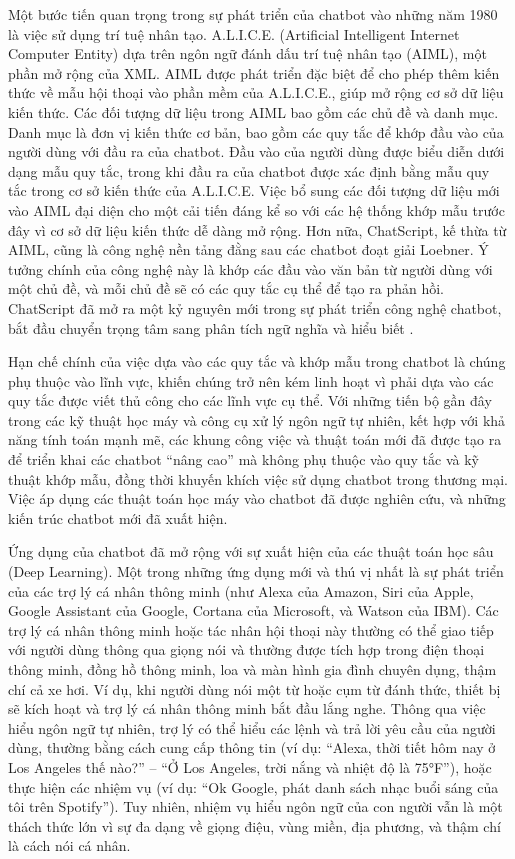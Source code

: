 Một bước tiến quan trọng trong sự phát triển của chatbot vào những năm 1980 là việc sử dụng trí tuệ nhân tạo. A.L.I.C.E. (Artificial Intelligent Internet Computer Entity) dựa trên ngôn ngữ đánh dấu trí tuệ nhân tạo (AIML), một phần mở rộng của XML. AIML được phát triển đặc biệt để cho phép thêm kiến thức về mẫu hội thoại vào phần mềm của A.L.I.C.E., giúp mở rộng cơ sở dữ liệu kiến thức. Các đối tượng dữ liệu trong AIML bao gồm các chủ đề  và danh mục. Danh mục là đơn vị kiến thức cơ bản, bao gồm các quy tắc để khớp đầu vào của người dùng với đầu ra của chatbot. Đầu vào của người dùng được biểu diễn dưới dạng mẫu quy tắc, trong khi đầu ra của chatbot được xác định bằng mẫu quy tắc trong cơ sở kiến thức của A.L.I.C.E. Việc bổ sung các đối tượng dữ liệu mới vào AIML đại diện cho một cải tiến đáng kể so với các hệ thống khớp mẫu trước đây vì cơ sở dữ liệu kiến thức dễ dàng mở rộng. Hơn nữa, ChatScript, kế thừa từ AIML, cũng là công nghệ nền tảng đằng sau các chatbot đoạt giải Loebner. Ý tưởng chính của công nghệ này là khớp các đầu vào văn bản từ người dùng với một chủ đề, và mỗi chủ đề sẽ có các quy tắc cụ thể để tạo ra phản hồi. ChatScript đã mở ra một kỷ nguyên mới trong sự phát triển công nghệ chatbot, bắt đầu chuyển trọng tâm sang phân tích ngữ nghĩa và hiểu biết \cite{cahn2017chatbot,bradesko2012survey, wilcox2014winning, abushawar2015alice, shum2018elizaxiaoicechallengesopportunities,zemcik2019chatbots}.


Hạn chế chính của việc dựa vào các quy tắc và khớp mẫu trong chatbot là chúng phụ thuộc vào lĩnh vực, khiến chúng trở nên kém linh hoạt vì phải dựa vào các quy tắc được viết thủ công cho các lĩnh vực cụ thể. Với những tiến bộ gần đây trong các kỹ thuật học máy và công cụ xử lý ngôn ngữ tự nhiên, kết hợp với khả năng tính toán mạnh mẽ, các khung công việc và thuật toán mới đã được tạo ra để triển khai các chatbot “nâng cao” mà không phụ thuộc vào quy tắc và kỹ thuật khớp mẫu, đồng thời khuyến khích việc sử dụng chatbot trong thương mại. Việc áp dụng các thuật toán học máy vào chatbot đã được nghiên cứu, và những kiến trúc chatbot mới đã xuất hiện.


Ứng dụng của chatbot đã mở rộng với sự xuất hiện của các thuật toán học sâu (Deep Learning). Một trong những ứng dụng mới và thú vị nhất là sự phát triển của các trợ lý cá nhân thông minh (như Alexa của Amazon, Siri của Apple, Google Assistant của Google, Cortana của Microsoft, và Watson của IBM). Các trợ lý cá nhân thông minh hoặc tác nhân hội thoại này thường có thể giao tiếp với người dùng thông qua giọng nói và thường được tích hợp trong điện thoại thông minh, đồng hồ thông minh, loa và màn hình gia đình chuyên dụng, thậm chí cả xe hơi. Ví dụ, khi người dùng nói một từ hoặc cụm từ đánh thức, thiết bị sẽ kích hoạt và trợ lý cá nhân thông minh bắt đầu lắng nghe. Thông qua việc hiểu ngôn ngữ tự nhiên, trợ lý có thể hiểu các lệnh và trả lời yêu cầu của người dùng, thường bằng cách cung cấp thông tin (ví dụ: “Alexa, thời tiết hôm nay ở Los Angeles thế nào?” – “Ở Los Angeles, trời nắng và nhiệt độ là 75°F”), hoặc thực hiện các nhiệm vụ (ví dụ: “Ok Google, phát danh sách nhạc buổi sáng của tôi trên Spotify”). Tuy nhiên, nhiệm vụ hiểu ngôn ngữ của con người vẫn là một thách thức lớn vì sự đa dạng về giọng điệu, vùng miền, địa phương, và thậm chí là cách nói cá nhân.



